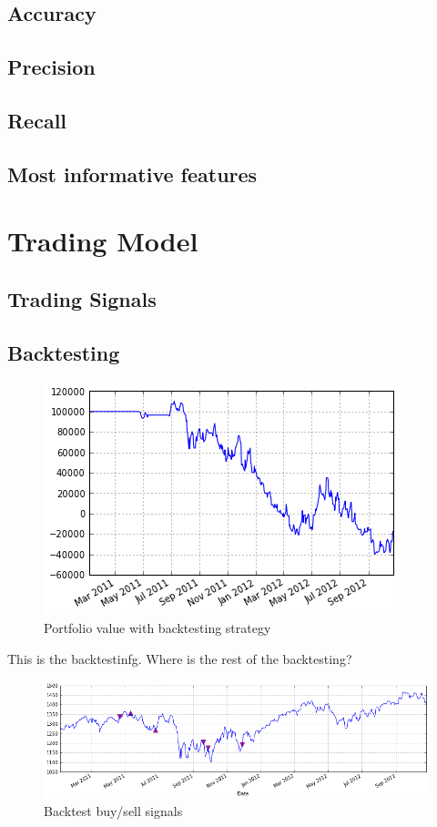 \documentclass[]{article}
\begin{document}
\subsection{Accuracy}


\subsection{Precision}

\subsection{Recall}
\subsection{Most informative features}
\section{Trading Model}
\subsection{Trading Signals}
\subsection{Backtesting}
\begin{figure}
\centering
\includegraphics[scale=0.6]{paper/img/backtestPortValue.png}
\caption{Portfolio value with backtesting strategy}
\end{figure}

This is the backtestinfg. Where is the rest of the backtesting?
\begin{figure}
\centering
\includegraphics[scale=0.6]{paper/img/backtestNB.png}
\caption{Backtest buy/sell signals}
\end{figure}
\end{document}
